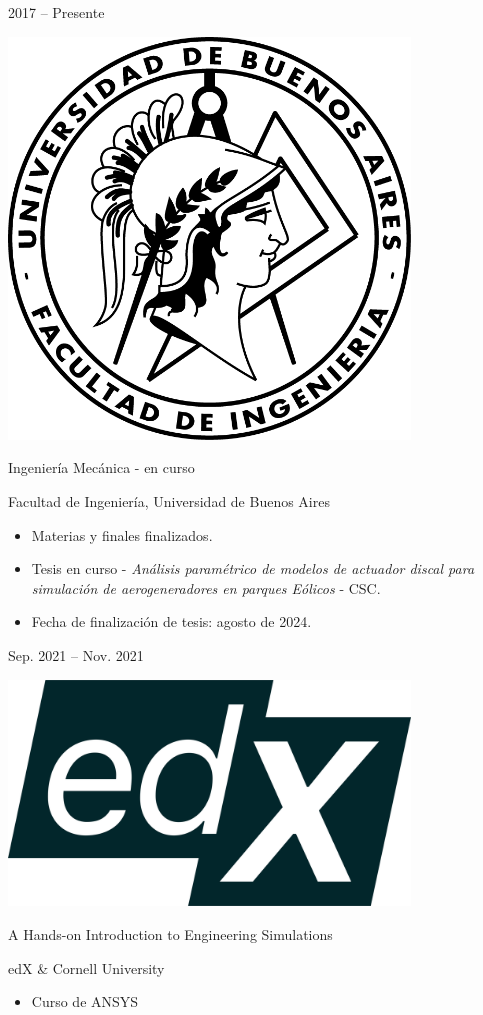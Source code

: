 \documentclass[a4paper,10pt]{article}
\newlength{\cvcolumngapwidth}
\newlength{\cvleftcolumnwidth}
\newlength{\cvrightcolumnwidth}
\newcommand{\cvtitlestyle}[1]{{\large\cvtitlefont\textcolor{cvtitlecolor}{#1}}}
\newcommand{\cvdurationstyle}[1]{{\small\cvdurationfont\textcolor{cvdurationcolor}{#1}}}
\newlength{\cvafteritemskipamount}
\newlength{\cvaftertitleskipamount}
\newlength{\cvparskip}
\newcommand{\cvitem}[2]{
    \begin{minipage}[t]{\cvleftcolumnwidth}
        \raggedleft #1
    \end{minipage}%
    \hspace{\cvcolumngapwidth}%
    \begin{minipage}[t]{\cvrightcolumnwidth}
        \setlength{\parskip}{\cvparskip} #2
    \end{minipage}

    \vspace{\cvafteritemskipamount}
}
\newcommand{\cvtitle}[1]{
    \cvtitlestyle{#1}

    \vspace{\cvaftertitleskipamount}
    \vspace{-\cvparskip}
}
\begin{document}
\cvitem{
    \cvdurationstyle{2017 -- Presente}
}{
    \begin{minipage}{0.1\textwidth}
        \centering
        \includegraphics[width=0.8\textwidth]{../logos-photos/Logo_FIUBA.png}   
    \end{minipage}      
    \cvtitle{Ingeniería Mecánica - en curso}

    Facultad de Ingeniería, Universidad de Buenos Aires
    
    \begin{itemize}[leftmargin=*]
        \item Materias y finales finalizados.
        \item Tesis en curso - \textit{Análisis paramétrico de modelos de actuador discal para simulación de aerogeneradores en parques Eólicos} - CSC.
        \item Fecha de finalización de tesis: agosto de 2024.
    \end{itemize}
}

\cvitem{
    \cvdurationstyle{Sep. 2021 -- Nov. 2021}
}{
    \begin{minipage}{0.1\textwidth}
        \centering
        \includegraphics[width=0.8\textwidth]{../logos-photos/Logo_edx.png}   
    \end{minipage}      
    \cvtitle{A Hands-on Introduction to Engineering Simulations}
    edX \& Cornell University

    \begin{itemize}
        \item Curso de ANSYS
    \end{itemize}
}
\end{document}
